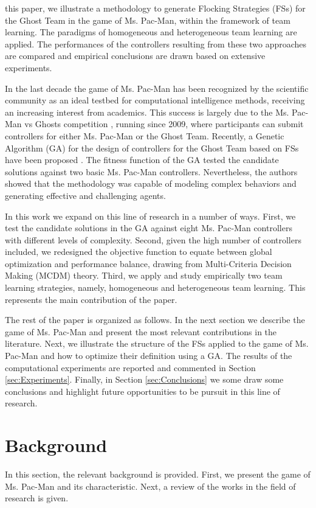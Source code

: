 \documentclass[journal]{IEEEtran}
\begin{document}
 this paper, we illustrate a methodology to generate Flocking Strategies (FSs) for the Ghost Team in the game of Ms. Pac-Man, within the framework of team learning. The paradigms of homogeneous and heterogeneous team learning are applied. The performances of the controllers resulting from these two approaches are compared and empirical conclusions are drawn based on extensive experiments.

In the last decade the game of Ms. Pac-Man has been recognized by the scientific community as an ideal testbed for computational intelligence methods, receiving an increasing interest from academics. This success is largely due to the Ms. Pac-Man vs Ghosts competition \cite{Lucas2009,MsPacManVSGhost2011}, running since 2009, where participants can submit controllers for either Ms. Pac-Man or the Ghost Team. Recently, a Genetic Algorithm (GA) for the design of controllers for the Ghost Team based on FSs have been proposed \cite{Liberatore2014}. The fitness function of the GA tested the candidate solutions against two basic Ms. Pac-Man controllers. Nevertheless, the authors showed that the methodology was capable of modeling complex behaviors and generating effective and challenging agents.

In this work we expand on this line of research in a number of ways. First, we test the candidate solutions in the GA against eight Ms. Pac-Man controllers with different levels of complexity. Second, given the high number of controllers included, we redesigned the objective function to equate between global optimization and performance balance, drawing from Multi-Criteria Decision Making (MCDM) theory. Third, we apply and study empirically two team learning strategies, namely, homogeneous and heterogeneous team learning. This represents the main contribution of the paper.

The rest of the paper is organized as follows. In the next section we describe the game of Ms. Pac-Man and present the most relevant contributions in the literature. Next, we illustrate the structure of the FSs applied to the game of Ms. Pac-Man and how to optimize their definition using a GA. The results of the computational experiments are reported and commented in Section \ref{sec:Experiments}. Finally, in Section \ref{sec:Conclusions} we some draw some conclusions and highlight future opportunities to be pursuit in this line of research.

\section{Background}
\label{sec:Background}
In this section, the relevant background is provided. First, we present the game of Ms. Pac-Man and its characteristic. Next, a review of the works in the field of research is given.
\end{document}
